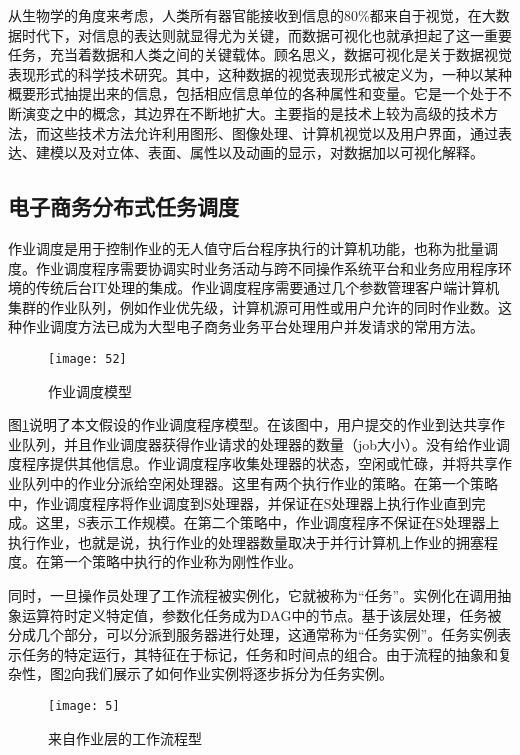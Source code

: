 从生物学的角度来考虑，人类所有器官能接收到信息的80\%都来自于视觉，在大数据时代下，对信息的表达则就显得尤为关键，而数据可视化也就承担起了这一重要任务，充当着数据和人类之间的关键载体。顾名思义，数据可视化是关于数据视觉表现形式的科学技术研究。其中，这种数据的视觉表现形式被定义为，一种以某种概要形式抽提出来的信息，包括相应信息单位的各种属性和变量。它是一个处于不断演变之中的概念，其边界在不断地扩大。主要指的是技术上较为高级的技术方法，而这些技术方法允许利用图形、图像处理、计算机视觉以及用户界面，通过表达、建模以及对立体、表面、属性以及动画的显示，对数据加以可视化解释。
\subsection{电子商务分布式任务调度}
作业调度是用于控制作业的无人值守后台程序执行的计算机功能，也称为批量调度。作业调度程序需要协调实时业务活动与跨不同操作系统平台和业务应用程序环境的传统后台IT处理的集成。作业调度程序需要通过几个参数管理客户端计算机集群的作业队列，例如作业优先级，计算机源可用性或用户允许的同时作业数。这种作业调度方法已成为大型电子商务业务平台处理用户并发请求的常用方法。

\begin{figure}
	\centering
	\texttt{[image: 52]}
	\caption{作业调度模型}
	\label{fig-1}
\end{figure}

图\ref{fig-1}说明了本文假设的作业调度程序模型。在该图中，用户提交的作业到达共享作业队列，并且作业调度器获得作业请求的处理器的数量（job大小）。没有给作业调度程序提供其他信息。作业调度程序收集处理器的状态，空闲或忙碌，并将共享作业队列中的作业分派给空闲处理器。这里有两个执行作业的策略。在第一个策略中，作业调度程序将作业调度到S处理器，并保证在S处理器上执行作业直到完成。这里，S表示工作规模。在第二个策略中，作业调度程序不保证在S处理器上执行作业，也就是说，执行作业的处理器数量取决于并行计算机上作业的拥塞程度。在第一个策略中执行的作业称为刚性作业。

同时，一旦操作员处理了工作流程被实例化，它就被称为“任务”。实例化在调用抽象运算符时定义特定值，参数化任务成为DAG中的节点。基于该层处理，任务被分成几个部分，可以分派到服务器进行处理，这通常称为“任务实例”。任务实例表示任务的特定运行，其特征在于标记，任务和时间点的组合。由于流程的抽象和复杂性，图\ref{fig-2}向我们展示了如何作业实例将逐步拆分为任务实例。

\begin{figure}[htbp]
	\centering
	\texttt{[image: 5]}
	\caption{来自作业层的工作流程型}
	\label{fig-2}
\end{figure}
